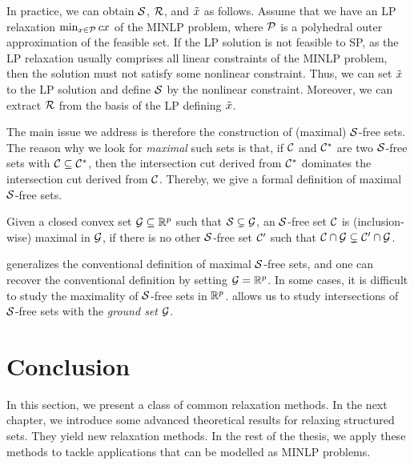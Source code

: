 In practice, we can obtain $\mathcal S$, $\mathcal R$, and $\tilde{x}$  as follows. Assume that we have an LP relaxation $\min_{x \in \mathcal P} c x$ of the MINLP problem, where $\mathcal P$ is a polyhedral outer approximation of the feasible set. If the LP solution is not feasible to SP, as the LP relaxation usually comprises all linear constraints of the MINLP problem, then the solution must not satisfy some  nonlinear constraint.  Thus, we can set $\tilde{x}$ to the LP solution and define $\mathcal S$ by  the nonlinear constraint. Moreover,  we can extract $\mathcal R$ from the basis of the LP defining $\tilde{x}$. 


The main issue we address is therefore the construction of  (maximal) $\mathcal S$-free sets.  The reason why we look for \emph{maximal} such sets is that, if
$\mathcal C$ and $\mathcal C^\ast$ are two $\mathcal S$-free sets with $\mathcal C \subseteq \mathcal C^\ast$, then the intersection cut derived from $\mathcal C^\ast$ dominates the intersection cut derived from $\mathcal C$. Thereby, we give a formal definition of maximal $\mathcal S$-free sets.

\begin{definition}
\label{def.max}
Given  a closed convex set $\mathcal G \subseteq \mathbb R^p$ such that $\mathcal S \subsetneq \mathcal G$, an  $\mathcal S$-free set $\mathcal C$ is (inclusion-wise) maximal in $\mathcal G$,  if there is no other $\mathcal S$-free set $\mathcal C'$ such that $\mathcal C \cap \mathcal G \subsetneq \mathcal C' \cap \mathcal G $.
\end{definition}

 generalizes the conventional definition of  maximal $\mathcal S$-free sets, and one can recover the conventional definition by setting $\mathcal G = \mathbb R^p$.  In some cases, it is difficult to study the maximality of $\mathcal S$-free sets in $\mathbb R^p$.  allows us to study intersections of $\mathcal S$-free sets with the \emph{ground set}  $\mathcal G$.  


\section{Conclusion}

In this section, we present a class of common relaxation methods. In the next chapter, we introduce some advanced theoretical results for relaxing structured sets. They yield new relaxation methods. In the rest of the thesis, we apply these methods to tackle applications that can be modelled as MINLP problems.
